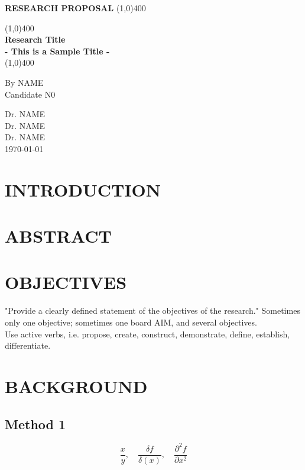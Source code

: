 \documentclass[a4paper]{article}
\begin{document}
\begin{titlepage}
\begin{center}
\vspace{1cm}
\large{\textbf{RESEARCH PROPOSAL}}
\line(1,0){400}\\
\vfill

\line(1,0){400}\\[1mm]
\huge{\textbf{Research Title}}\\[1mm]
\large{\textbf{- This is a Sample Title -}}\\[1mm]
\line(1,0){400}\\[1mm]
\vfill

By NAME\\
Candidate N0\\
\vfill

Dr. NAME\\
Dr. NAME\\
Dr. NAME\\

\today\\
\end{center}
\end{titlepage}

\tableofcontents
\thispagestyle{empty}
\clearpage

\setcounter{page}{1}
\section{INTRODUCTION}
\section{ABSTRACT}
\section{OBJECTIVES}
"Provide a clearly defined statement of the objectives of the research." Sometimes only one objective; sometimes one board AIM, and several objectives.\\
Use active verbs, i.e. propose, create, construct, demonstrate, define, establish, differentiate.
\section{BACKGROUND}
\cite{cole1989kinematics}
\cite{525325}
\cite{sadeghi2009review}


\subsection{Method 1}
\begin{equation}
\frac{x}{y}, \quad
\frac{\delta{f}}{\delta(x)},\quad
\frac{\partial^{2}{f}}{\partial{x}{^2}}
\end{equation}
\end{document}
